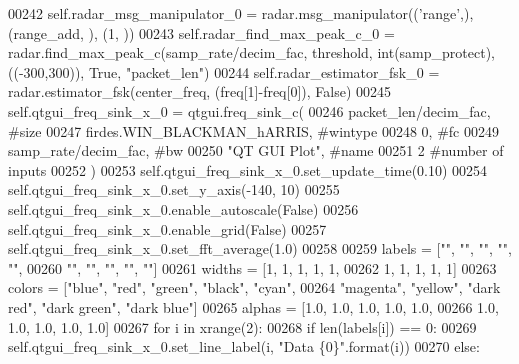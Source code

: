 \begin{DoxyCode}
00242         self.radar_msg_manipulator_0 = radar.msg\_manipulator((\textcolor{stringliteral}{'range'},), (range\_add, ), (1, ))
00243         self.radar_find_max_peak_c_0 = radar.find\_max\_peak\_c(samp\_rate/decim\_fac, threshold, 
      int(samp\_protect), ((-300,300)), \textcolor{keyword}{True}, \textcolor{stringliteral}{"packet\_len"})
00244         self.radar_estimator_fsk_0 = radar.estimator\_fsk(center\_freq, (freq[1]-freq[0]), \textcolor{keyword}{False})
00245         self.qtgui_freq_sink_x_0 = qtgui.freq\_sink\_c(
00246             packet\_len/decim\_fac, \textcolor{comment}{#size}
00247             firdes.WIN\_BLACKMAN\_hARRIS, \textcolor{comment}{#wintype}
00248             0, \textcolor{comment}{#fc}
00249             samp\_rate/decim\_fac, \textcolor{comment}{#bw}
00250             \textcolor{stringliteral}{"QT GUI Plot"}, \textcolor{comment}{#name}
00251             2 \textcolor{comment}{#number of inputs}
00252         )
00253         self.qtgui\_freq\_sink\_x\_0.set\_update\_time(0.10)
00254         self.qtgui\_freq\_sink\_x\_0.set\_y\_axis(-140, 10)
00255         self.qtgui\_freq\_sink\_x\_0.enable\_autoscale(\textcolor{keyword}{False})
00256         self.qtgui\_freq\_sink\_x\_0.enable\_grid(\textcolor{keyword}{False})
00257         self.qtgui\_freq\_sink\_x\_0.set\_fft\_average(1.0)
00258         
00259         labels = [\textcolor{stringliteral}{""}, \textcolor{stringliteral}{""}, \textcolor{stringliteral}{""}, \textcolor{stringliteral}{""}, \textcolor{stringliteral}{""},
00260                   \textcolor{stringliteral}{""}, \textcolor{stringliteral}{""}, \textcolor{stringliteral}{""}, \textcolor{stringliteral}{""}, \textcolor{stringliteral}{""}]
00261         widths = [1, 1, 1, 1, 1,
00262                   1, 1, 1, 1, 1]
00263         colors = [\textcolor{stringliteral}{"blue"}, \textcolor{stringliteral}{"red"}, \textcolor{stringliteral}{"green"}, \textcolor{stringliteral}{"black"}, \textcolor{stringliteral}{"cyan"},
00264                   \textcolor{stringliteral}{"magenta"}, \textcolor{stringliteral}{"yellow"}, \textcolor{stringliteral}{"dark red"}, \textcolor{stringliteral}{"dark green"}, \textcolor{stringliteral}{"dark blue"}]
00265         alphas = [1.0, 1.0, 1.0, 1.0, 1.0,
00266                   1.0, 1.0, 1.0, 1.0, 1.0]
00267         \textcolor{keywordflow}{for} i \textcolor{keywordflow}{in} xrange(2):
00268             \textcolor{keywordflow}{if} len(labels[i]) == 0:
00269                 self.qtgui\_freq\_sink\_x\_0.set\_line\_label(i, \textcolor{stringliteral}{"Data \{0\}"}.format(i))
00270             \textcolor{keywordflow}{else}:

\end{DoxyCode}
